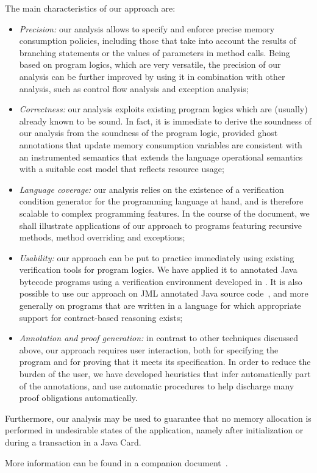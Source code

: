 The main characteristics of our approach are:
\begin{itemize}
\item \emph{Precision:} our analysis allows to specify and enforce
precise memory consumption policies, including those that take
into account the results of branching statements or the values of
parameters in method calls. Being based on program logics, which are
very versatile, the precision of our analysis can be further improved
by using it in combination with other analysis, such as control flow
analysis and exception analysis;


\item \emph{Correctness:} our analysis exploits existing program logics
which are (usually) already known to be sound. In fact, it is immediate
to derive the soundness of our analysis from the soundness of the program
logic, provided ghost annotations that update memory consumption variables
are consistent with an instrumented semantics that  extends the language
operational semantics with a suitable cost model that reflects resource
usage;

\item \emph{Language coverage:} our analysis relies on the existence
of a verification condition generator for the programming language at
hand, and is therefore scalable to complex programming features.  In
the course of the document, we shall illustrate applications of our
approach to programs featuring recursive methods, method
overriding and exceptions;


\item \emph{Usability:} our approach can be put to practice
immediately using existing verification tools for program logics. We
have applied it to annotated Java bytecode programs using a
verification environment developed in \cite{BP06:sac}. It is also
possible to use our approach on JML annotated Java source
code~\cite{BRL-JACK}, and more generally on programs that are written
in a language for which appropriate support for contract-based
reasoning exists;




\item \emph{Annotation and proof generation:} in contrast to other
techniques discussed above, our approach requires user interaction,
both for specifying the program and for proving that it meets its
specification.  In order to reduce the burden of the user, we have
developed heuristics that infer automatically part of the annotations,
and use automatic procedures to help discharge many proof obligations
automatically.
\end{itemize}
Furthermore, our analysis may be used to guarantee that no memory
allocation is performed in undesirable states of the application,
namely after initialization or during a transaction in a Java Card.

More information can be found in a companion document~\cite{gmg05:sefm}.

